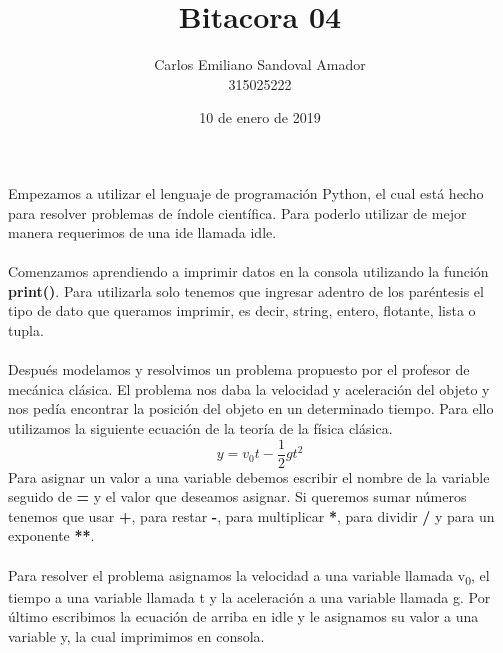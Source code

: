 \documentclass[letterpaper, 12pt, oneside]{article}%
\title{Bitacora 04}
\author{Carlos Emiliano Sandoval Amador \\ 315025222}
\date{10 de enero de 2019}
\begin{document}
	\maketitle
	Empezamos a utilizar el lenguaje de programación Python, el cual está hecho para resolver problemas de índole científica. Para poderlo utilizar de mejor manera requerimos de una ide llamada idle.\\ \\ Comenzamos aprendiendo a imprimir datos en la consola utilizando la función \textbf{print()}. Para utilizarla solo tenemos que ingresar adentro de los paréntesis el tipo de dato que queramos imprimir, es decir, string, entero, flotante, lista o tupla. \\ \\ Después modelamos y resolvimos un problema propuesto por el profesor de mecánica clásica. El problema nos daba la velocidad y aceleración del objeto y nos pedía encontrar la posición del objeto en un determinado tiempo. Para ello utilizamos la siguiente ecuación de la teoría de la física clásica.
	\begin{equation} %
		y = v_0t - \frac{1}{2}gt^2
	\end{equation}
	Para asignar un valor a una variable debemos escribir el nombre de la variable seguido de \textbf{=} y el valor que deseamos asignar. Si queremos sumar números tenemos que usar \textbf{+}, para restar \textbf{-}, para multiplicar \textbf{*}, para dividir \textbf{/} y para un exponente \textbf{**}. \\ \\ Para resolver el problema asignamos la velocidad a una variable llamada v\textsubscript{0}, el tiempo a una variable llamada t y la aceleración a una variable llamada g. Por último escribimos la ecuación de arriba en idle y le asignamos su valor a una variable y, la cual imprimimos en consola.
\end{document}
